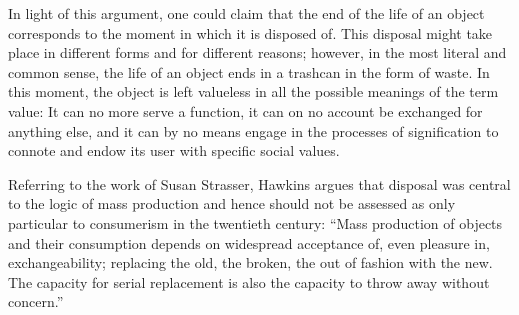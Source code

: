 In light of this argument, one could claim that the end of the life of an object corresponds to the moment in which it is disposed of. This disposal might take place in different forms and for different reasons; however, in the most literal and common sense, the life of an object ends in a trashcan in the form of waste. In this moment, the object is left valueless in all the possible meanings of the term value: It can no more serve a function, it can on no account be exchanged for anything else, and it can by no means engage in the processes of signification to connote and endow its user with specific social values.

Referring to the work of Susan Strasser, Hawkins argues that disposal was central to the logic of mass production and hence should not be assessed as only particular to consumerism in the twentieth century: “Mass production of objects and their consumption depends on widespread acceptance of, even pleasure in, exchangeability; replacing the old, the broken, the out of fashion with the new. The capacity for serial replacement is also the capacity to throw away without concern.”


